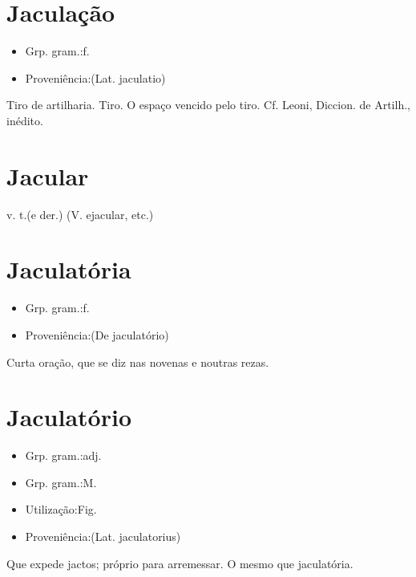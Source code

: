 \documentclass{article}
\begin{document}
\section{Jaculação}
\begin{itemize}
\item {Grp. gram.:f.}
\end{itemize}
\begin{itemize}
\item {Proveniência:(Lat. \textunderscore jaculatio\textunderscore )}
\end{itemize}
Tiro de artilharia.
Tiro.
O espaço vencido pelo tiro. Cf. Leoni, \textunderscore Diccion. de Artilh.\textunderscore , inédito.
\section{Jacular}
\textunderscore v. t.\textunderscore  (e der.)
(V. \textunderscore ejacular\textunderscore , etc.)
\section{Jaculatória}
\begin{itemize}
\item {Grp. gram.:f.}
\end{itemize}
\begin{itemize}
\item {Proveniência:(De \textunderscore jaculatório\textunderscore )}
\end{itemize}
Curta oração, que se diz nas novenas e noutras rezas.
\section{Jaculatório}
\begin{itemize}
\item {Grp. gram.:adj.}
\end{itemize}
\begin{itemize}
\item {Grp. gram.:M.}
\end{itemize}
\begin{itemize}
\item {Utilização:Fig.}
\end{itemize}
\begin{itemize}
\item {Proveniência:(Lat. \textunderscore jaculatorius\textunderscore )}
\end{itemize}
Que expede jactos; próprio para arremessar.
O mesmo que \textunderscore jaculatória\textunderscore .
\end{document}
